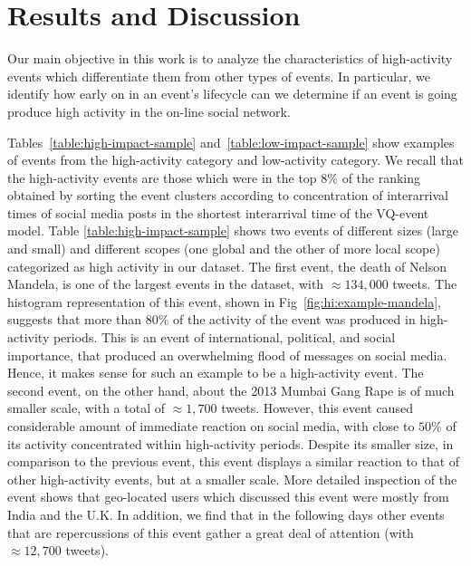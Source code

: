 \section{Results and Discussion}

Our main objective in this work is to analyze the characteristics of
high-activity events which differentiate them from other types of events. 
%
In particular, we identify how early on in an event's lifecycle can we determine
if an event is going produce high activity in the on-line social network.




Tables~\ref{table:high-impact-sample} and~\ref{table:low-impact-sample} show
examples of events from the high-activity category and low-activity category. 
%
We recall that the high-activity events are those which were in the top 8\% of
the ranking obtained by sorting the event clusters according to concentration of
interarrival times of social media posts in the shortest interarrival time of
the VQ-event model.  
%
Table \ref{table:high-impact-sample} shows two events of different sizes (large
and small) and different scopes (one global and the other of more local scope)
categorized as high activity in our dataset. 
%
The first event, the death of Nelson Mandela, is one of the largest events in
the dataset, with $\approx 134,000$ tweets. 
%
The histogram representation of this event, shown in
Fig~\ref{fig:hi:example-mandela}, suggests that more than $80\%$ of the activity
of the event was produced in high-activity periods.
%
This is an event of international, political, and social importance, that
produced an overwhelming flood of messages on social media. %
%
Hence, it makes sense for such an example to be a high-activity event. 
%
The second event, on the other hand, about the 2013 Mumbai Gang Rape is of much
smaller scale, with a total of $\approx 1,700$ tweets. 
%
However, this event caused considerable amount of immediate reaction on social
media, with close to $50\%$ of its activity concentrated within high-activity
periods. 
%
Despite its smaller size, in comparison to the previous event, this event
displays a similar reaction to that of other high-activity events, but at a
smaller scale. 
%
More detailed inspection of the event shows that geo-located users which
discussed this event were mostly from India and the U.K. 
%
In addition, we find that in the following days other events that are
repercussions of this event gather a great deal of attention (with $\approx
12,700$ tweets).


